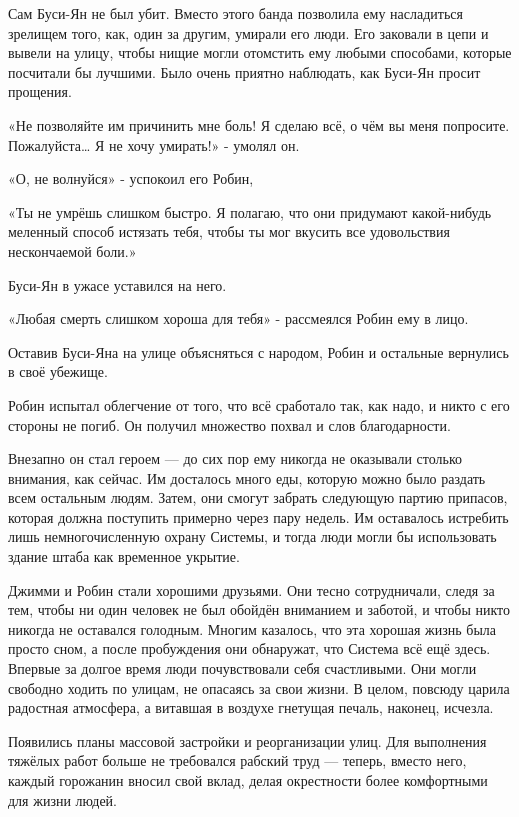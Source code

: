 \documentclass[a4paper,12pt]{book}
\begin{document}
\par
Сам Буси-Ян не был убит. Вместо этого банда позволила ему насладиться зрелищем того, как, один за другим, умирали его люди. Его заковали в цепи и вывели на улицу, чтобы нищие могли отомстить ему любыми способами, которые посчитали бы лучшими. Было очень приятно наблюдать, как Буси-Ян просит прощения.
\par
«Не позволяйте им причинить мне боль! Я сделаю всё, о чём вы меня попросите. Пожалуйста… Я не хочу умирать!» - умолял он.
\par
«О, не волнуйся» - успокоил его Робин,
\par
«Ты не умрёшь слишком быстро. Я полагаю, что они придумают какой-нибудь меленный способ истязать тебя, чтобы ты мог вкусить все удовольствия нескончаемой боли.»
\par
Буси-Ян в ужасе уставился на него.
\par
«Любая смерть слишком хороша для тебя» - рассмеялся Робин ему в лицо.
\par
Оставив Буси-Яна на улице объясняться с народом, Робин и остальные вернулись в своё убежище.
\par
Робин испытал облегчение от того, что всё сработало так, как надо, и никто с его стороны не погиб. Он получил множество похвал и слов благодарности.
\par
Внезапно он стал героем — до сих пор ему никогда не оказывали столько внимания, как сейчас. Им досталось много еды, которую можно было раздать всем остальным людям. Затем, они смогут забрать следующую партию припасов, которая должна поступить примерно через пару недель. Им оставалось истребить лишь немногочисленную охрану Системы, и тогда люди могли бы использовать здание штаба как временное укрытие.\\
\par
Джимми и Робин стали хорошими друзьями. Они тесно сотрудничали, следя за тем, чтобы ни один человек не был обойдён вниманием и заботой, и чтобы никто никогда не оставался голодным. Многим казалось, что эта хорошая жизнь была просто сном, а после пробуждения они обнаружат, что Система всё ещё здесь. Впервые за долгое время люди почувствовали себя счастливыми. Они могли свободно ходить по улицам, не опасаясь за свои жизни. В целом, повсюду царила радостная атмосфера, а витавшая в воздухе гнетущая печаль, наконец, исчезла.
\par
Появились планы массовой застройки и реорганизации улиц. Для выполнения тяжёлых работ больше не требовался рабский труд — теперь, вместо него, каждый горожанин вносил свой вклад, делая окрестности более комфортными для жизни людей.\\
\end{document}
